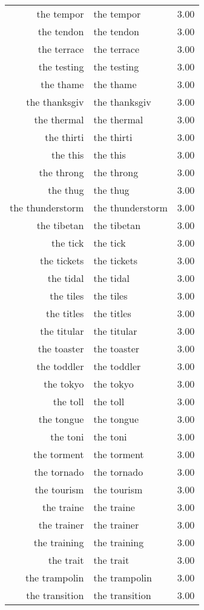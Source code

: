 \begin{table}[ht]
\begin{tabular}{rlr}
  the tempor & the tempor & 3.00 \\ 
  the tendon & the tendon & 3.00 \\ 
  the terrace & the terrace & 3.00 \\ 
  the testing & the testing & 3.00 \\ 
  the thame & the thame & 3.00 \\ 
  the thanksgiv & the thanksgiv & 3.00 \\ 
  the thermal & the thermal & 3.00 \\ 
  the thirti & the thirti & 3.00 \\ 
  the this & the this & 3.00 \\ 
  the throng & the throng & 3.00 \\ 
  the thug & the thug & 3.00 \\ 
  the thunderstorm & the thunderstorm & 3.00 \\ 
  the tibetan & the tibetan & 3.00 \\ 
  the tick & the tick & 3.00 \\ 
  the tickets & the tickets & 3.00 \\ 
  the tidal & the tidal & 3.00 \\ 
  the tiles & the tiles & 3.00 \\ 
  the titles & the titles & 3.00 \\ 
  the titular & the titular & 3.00 \\ 
  the toaster & the toaster & 3.00 \\ 
  the toddler & the toddler & 3.00 \\ 
  the tokyo & the tokyo & 3.00 \\ 
  the toll & the toll & 3.00 \\ 
  the tongue & the tongue & 3.00 \\ 
  the toni & the toni & 3.00 \\ 
  the torment & the torment & 3.00 \\ 
  the tornado & the tornado & 3.00 \\ 
  the tourism & the tourism & 3.00 \\ 
  the traine & the traine & 3.00 \\ 
  the trainer & the trainer & 3.00 \\ 
  the training & the training & 3.00 \\ 
  the trait & the trait & 3.00 \\ 
  the trampolin & the trampolin & 3.00 \\ 
  the transition & the transition & 3.00 \\ 

\end{tabular}
\end{table}
